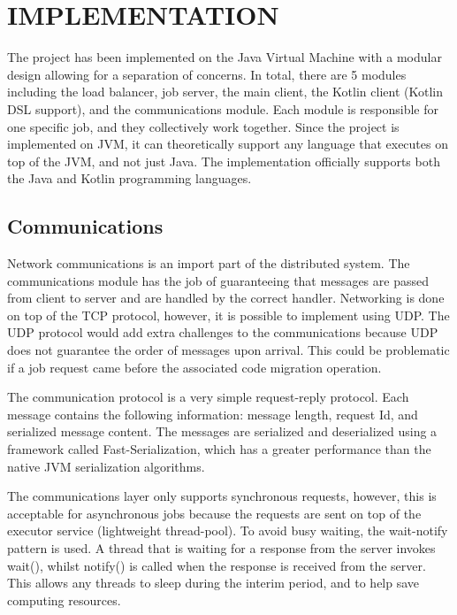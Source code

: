 \section{IMPLEMENTATION}\label{sec:impl}

The project has been implemented on the Java Virtual Machine with a modular design allowing for
a separation of concerns.
In total, there are 5 modules including the load balancer, job server, the main client,
the Kotlin client (Kotlin DSL support), and the communications module.
Each module is responsible for one specific job, and they collectively work together.
Since the project is implemented on JVM, it can theoretically support any language
that executes on top of the JVM, and not just Java.
The implementation officially supports both the Java and Kotlin programming languages.

\subsection{Communications}\label{subsec:communcations}

Network communications is an import part of the distributed system.
The communications module has the job of guaranteeing that messages
are passed from client to server and are handled by the correct handler.
Networking is done on top of the TCP protocol, however, it is possible to
implement using UDP.
The UDP protocol would add extra challenges to the communications because
UDP does not guarantee the order of messages upon arrival.
This could be problematic if a job request came before the associated
code migration operation.

The communication protocol is a very simple request-reply protocol.
Each message contains the following information:
message length, request Id, and serialized message content.
The messages are serialized and deserialized using a framework called Fast-Serialization,
which has a greater performance than the native JVM serialization algorithms.

The communications layer only supports synchronous requests, however, this is acceptable
for asynchronous jobs because the requests are sent on top of the executor service (lightweight thread-pool).
To avoid busy waiting, the wait-notify pattern is used.
A thread that is waiting for a response from the server invokes wait(),
whilst notify() is called when the response is received from the server.
This allows any threads to sleep during the interim period, and to help
save computing resources.

